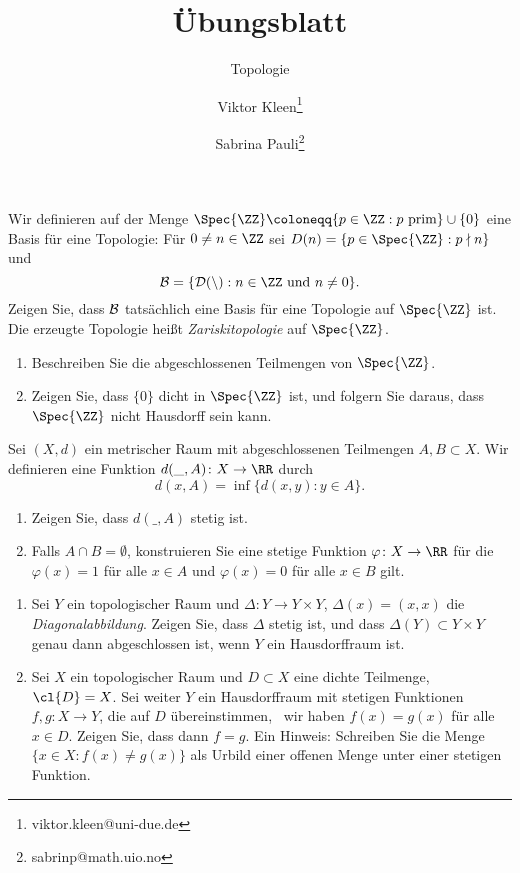 

\setcounter{Sheet}{3}

\title{Übungsblatt \theSheet}
\subtitle{Topologie}
\author{Viktor Kleen\footnote{viktor.kleen@uni-due.de} \and Sabrina Pauli\footnote{sabrinp@math.uio.no}}
\date{}


\maketitle
\begin{exercise}
Wir definieren auf der Menge $\Spec{\ZZ} \coloneqq \{p\in\ZZ : \textnormal{$p$
prim}\}\cup \{0\}$ eine Basis für eine Topologie: Für $0\neq n\in\ZZ$
sei $D(n) = \{p\in\Spec{\ZZ} : p \nmid n\}$ und
\[
\cal B = \{ D(n) : \textnormal{$n\in\ZZ$ und $n\neq 0$}\}.
\]
Zeigen Sie, dass $\cal B$ tatsächlich eine Basis für eine Topologie auf
$\Spec{\ZZ}$ ist. Die erzeugte Topologie heißt \emph{Zariskitopologie}
auf $\Spec{\ZZ}$.
\begin{enumerate}
\item Beschreiben Sie die abgeschlossenen Teilmengen von $\Spec{\ZZ}$.
\item Zeigen Sie, dass $\{0\}$ dicht in $\Spec{\ZZ}$ ist, und folgern Sie daraus, dass
$\Spec{\ZZ}$ nicht Hausdorff sein kann.
\end{enumerate}
\end{exercise}
\begin{exercise}
Sei $(X,d)$ ein metrischer Raum mit abgeschlossenen Teilmengen $A,B\subset X$.
Wir definieren eine Funktion $d(\_,A)\colon X\to\RR$ durch
\[
d(x,A) = \inf\{ d(x,y) : y\in A\}.
\]
\begin{enumerate}
\item Zeigen Sie, dass $d(\_,A)$ stetig ist.
\item Falls $A\cap B = \emptyset$, konstruieren Sie eine stetige Funktion $\varphi\colon
X\to \RR$ für die $\varphi(x) = 1$ für alle $x\in A$ und $\varphi(x) = 0$ für
alle $x\in B$ gilt.
\end{enumerate}
\end{exercise}
\begin{exercise}\leavevmode
\begin{enumerate}
\item Sei $Y$ ein topologischer Raum und $\Delta\colon Y\to Y\times Y$, $\Delta (x) = (x,x)$ die
\emph{Diagonalabbildung}. Zeigen Sie, dass $\Delta$ stetig ist, und dass
$\Delta(Y)\subset Y\times Y$ genau dann abgeschlossen ist, wenn $Y$ ein
Hausdorffraum ist.
\item Sei $X$ ein topologischer Raum und $D\subset X$ eine dichte Teilmenge,
\ddh~$\cl{D} = X$. Sei weiter $Y$ ein Hausdorffraum mit stetigen Funktionen $f,g\colon X\to Y$, die auf
$D$ übereinstimmen, \ddh~wir haben $f(x) = g(x)$ für alle $x\in D$. Zeigen Sie,
dass dann $f = g$. {\footnotesize Ein Hinweis: Schreiben Sie die Menge $\{x\in X :
f(x)\neq g(x)\}$ als Urbild einer offenen Menge unter einer stetigen Funktion.}
\end{enumerate}
\end{exercise}

